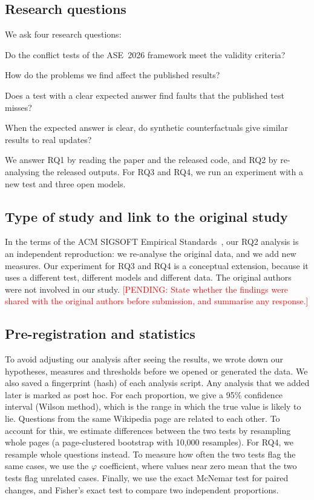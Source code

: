 \documentclass[preprint,12pt,authoryear]{elsarticle}
\newcommand{\pending}[1]{\textcolor{red}{[PENDING: #1]}}
\begin{document}
\subsection{Research questions}
We ask four research questions:
\begin{description}[leftmargin=*]
  \item[RQ1] Do the conflict tests of the ASE~2026 framework meet the validity criteria?
  \item[RQ2] How do the problems we find affect the published results?
  \item[RQ3] Does a test with a clear expected answer find faults that the published test misses?
  \item[RQ4] When the expected answer is clear, do synthetic counterfactuals give similar results to
             real updates?
\end{description}
We answer RQ1 by reading the paper and the released code, and RQ2 by re-analysing the released
outputs. For RQ3 and RQ4, we run an experiment with a new test and three open models.

\subsection{Type of study and link to the original study}
In the terms of the ACM SIGSOFT Empirical Standards~\citep{ralph2020empirical}, our RQ2 analysis is an
independent reproduction: we re-analyse the original data, and we add new measures. Our experiment for
RQ3 and RQ4 is a conceptual extension, because it uses a different test, different models and
different data. The original authors were not involved in our study.
\pending{State whether the findings were shared with the original authors before submission, and
summarise any response.}

\subsection{Pre-registration and statistics}
To avoid adjusting our analysis after seeing the results, we wrote down our hypotheses, measures and
thresholds before we opened or generated the data. We also saved a fingerprint (hash) of each
analysis script. Any analysis that we added later is marked as post hoc. For each proportion, we give
a 95\% confidence interval (Wilson method), which is the range in which the true value is likely to
lie. Questions from the same Wikipedia page are related to each other. To account for this, we
estimate differences between the two tests by resampling whole pages (a page-clustered bootstrap with
10{,}000 resamples). For RQ4, we resample whole questions instead. To measure how often the two tests
flag the same cases, we use the $\varphi$ coefficient, where values near zero mean that the two tests
flag unrelated cases. Finally, we use the exact McNemar test for paired changes, and Fisher's exact
test to compare two independent proportions.
\end{document}

